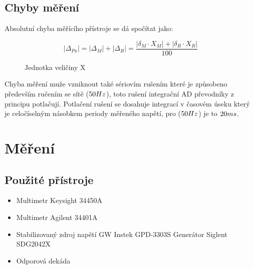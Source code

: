 \documentclass{article}
\begin{document}
\subsection{Chyby měření}
Absolutní chyba měřícího přístroje se dá spočítat jako:

\begin{figure}[H]
    \begin{equation}
        |\Delta_{Px}| = |\Delta_{M}|+|\Delta_{R}| = \frac{|\delta_M\cdot X_M|+|\delta_R\cdot X_R|}{100}
    \end{equation}
    \caption{\label{proud_kolektoru}Jednotka veličiny X}
\end{figure}
Chyba měření muže vzniknout také sériovím rušením které je způsobeno především ručením se sítě (\(50\-Hz\)), toto rušení integrační AD převodníky z principu potlačují.
Potlačení rušení se dosahuje integrací v časovém úseku který je celočíselným násobkem periody měřeného napětí, pro (\(50\-Hz\)) je to \(20\-ms\).

\section{Měření}
\subsection{Použité přístroje}
\begin{itemize}
    \item Multimetr Keysight 34450A
    \item Multimetr Agilent 34401A
    \item Stabilizovaný zdroj napětí GW Instek GPD-3303S Generátor Siglent SDG2042X
    \item Odporová dekáda
\end{itemize}
\end{document}
